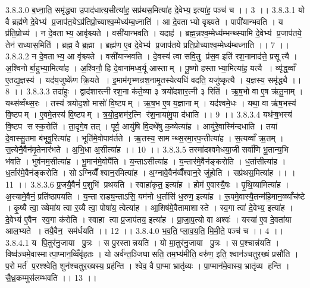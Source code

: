 3.8.3.0
ब॒ध्ना॒ति॒ समृ॑द्ध्या उ॒पाद॑धात्य॒सीत्या॑ह॒ सप्र॑थस॒मित्या॑ह दे॒वेभ्य॒ इत्या॑ह॒ पञ्च॑ च ।। 3 ।।
3.8.3.1
यो वै ब्रह्म॑णे दे॒वेभ्य॑ प्र॒जाप॑त॒येऽप्र॑तिप्रो॒च्याश्व॒म्मेध्य॑म्ब॒ध्नाति॑ । आ दे॒वताभ्यो वृश्च्यते । पापी॑यान्भवति । य प्र॑ति॒प्रोच्य॑ । न दे॒वताभ्य॒ आवृ॑श्च्यते । वसी॑यान्भवति । यदाह॑ । ब्रह्म॒न्नश्व॒म्मेध्य॑म्भन्थ्स्यामि दे॒वेभ्य॑ प्र॒जाप॑तये॒ तेन॑ राध्यास॒मिति॑ । ब्रह्म॒ वै ब्र॒ह्मा । ब्रह्म॑ण ए॒व दे॒वेभ्य॑ प्र॒जाप॑तये प्रति॒प्रोच्याश्व॒म्मेध्य॑म्बध्नाति ।। 7 ।।
3.8.3.2
न दे॒वताभ्य॒ आ वृ॑श्च्यते । वसी॑यान्भवति । दे॒वस्य॑ त्वा सवि॒तु प्र॑स॒व इति॑ रश॒नामाद॑त्ते॒ प्रसूत्यै । अ॒श्विनोर्बा॒हुभ्या॒मित्या॑ह । अ॒श्विनौ॒ हि दे॒वाना॑मध्व॒र्यू आस्ताम् । पू॒ष्णो हस्ताभ्या॒मित्या॑ह॒ यत्यै । व्यृ॑द्ध॒व्वाँ ए॒तद्य॒ज्ञस्य॑ । यद॑य॒जुष्के॑ण क्रि॒यते । इ॒माम॑गृभ्णन्रश॒नामृ॒तस्येत्यधि॑ वदति॒ यजु॑ष्कृत्यै । य॒ज्ञस्य॒ समृ॑द्ध्यै ।। 8 ।।
3.8.3.3
तदा॑हुः । द्वाद॑शारत्नी रश॒ना क॑र्त॒व्या ३ त्रयो॑दशार॒त्नी ३ रिति॑ । ऋ॒ष॒भो वा ए॒ष ऋ॑तू॒नाम् । यथ्स॑व्वँथ्स॒रः । तस्य॑ त्रयोद॒शो मासो॑ वि॒ष्टपम् । ऋ॒ष॒भ ए॒ष य॒ज्ञानाम् । यद॑श्वमे॒धः । यथा॒ वा ऋ॑ष॒भस्य॑ वि॒ष्टपम् । ए॒वमे॒तस्य॑ वि॒ष्टपम् । त्र॒यो॒द॒शम॑र॒त्नि र॑श॒नाया॑मु॒पा द॑धाति ।। 9 ।।
3.8.3.4
यथ॑ऱ्ष॒भस्य॑ वि॒ष्टप॑ सस्क॒रोति॑ । ता॒दृगे॒व तत् । पूर्व॒ आयु॑षि वि॒दथे॑षु क॒व्येत्या॑ह । आयु॑रे॒वास्मि॑न्दधाति । तया॑ दे॒वास्सु॒तमा ब॑भूवु॒रित्या॑ह । भूति॑मे॒वोपाव॑र्तते । ऋ॒तस्य॒ सामन्थ्स॒रमा॒रप॒न्तीत्या॑ह । स॒त्यव्वाँ ऋ॒तम् । स॒त्येनै॒वैन॑मृ॒तेनार॑भते । अ॒भि॒धा अ॒सीत्या॑ह ।। 10 ।।
3.8.3.5
तस्मा॑दश्वमेधया॒जी सर्वा॑णि भू॒तान्य॒भि भ॑वति । भुव॑नम॒सीत्या॑ह । भू॒मान॑मे॒वोपै॑ति । य॒न्ताऽसीत्या॑ह । य॒न्तार॑मे॒वैन॑ङ्करोति । ध॒र्तासीत्या॑ह । ध॒र्तार॑मे॒वैन॑ङ्करोति । सोऽग्निव्वैँश्वान॒रमित्या॑ह । अ॒ग्नावे॒वैन॑व्वैँश्वान॒रे जु॑होति । सप्र॑थस॒मित्या॑ह ।। । 11 ।।
3.8.3.6
प्र॒जयै॒वैनं॑ प॒शुभि॑ प्रथयति । स्वाहा॑कृत॒ इत्या॑ह । होम॑ ए॒वास्यै॒षः । पृ॒थि॒व्यामित्या॑ह । अ॒स्यामे॒वैनं॒ प्रति॑ष्ठापयति । य॒न्ता राड्य॒न्ताऽसि॒ यम॑नो ध॒र्तासि॑ ध॒रुण॒ इत्या॑ह । रू॒पमे॒वास्यै॒तन्म॑हि॒मान॒व्व्याँच॑ष्टे । कृ॒ष्यै त्वा॒ ख्षेमा॑य त्वा र॒य्यै त्वा॒ पोषा॑य॒ त्वेत्या॑ह । आ॒शिष॑मे॒वैतामाशास्ते । स्व॒गा त्वा॑ दे॒वेभ्य॒ इत्या॑ह । दे॒वेभ्य॑ ए॒वैन॑ स्व॒गा क॑रोति । स्वाहा त्वा प्र॒जाप॑तय॒ इत्या॑ह । प्रा॒जा॒प॒त्यो वा अश्वः॑ । यस्या॑ ए॒व दे॒वता॑या आल॒भ्यते । तयै॒वैन॒॒ सम॑र्धयति ।। 12 ।।
3.8.4.0
भ॒व॒ति॒ प्ला॒व॒य॒ति॒ मि॒मी॒ते॒ पञ्च॑ च ।। 4 ।।
3.8.4.1
य पि॒तुर॑नु॒जाया पु॒त्रः । स पु॒रस्तान्नयति । यो मा॒तुर॑नु॒जाया पु॒त्रः । स प॒श्चान्न॑यति । विष्व॑ञ्चमे॒वास्मात्पा॒प्मान॒व्विँवृ॑हतः । यो अर्व॑न्त॒ञ्जिघा॑सति॒ तम॒भ्य॑मीति॒ वरु॑ण॒ इति॒ श्वान॑ञ्चतुर॒ख्षं प्रसौ॑ति । प॒रो मर्त॑ प॒रश्श्वेति॒ शुन॑श्चतुर॒ख्षस्य॒ प्रह॑न्ति । श्वेव॒ वै पा॒प्मा भ्रातृ॑व्यः । पा॒प्मान॑मे॒वास्य॒ भ्रातृ॑व्य हन्ति । सै॒ध्र॒कम्मुस॑लम्भवति ।। 13 ।।
